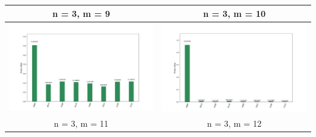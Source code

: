 \newpage
\begin{landscape}
\begin{table}[ht]
    \begin{tabular}{c c} 
        \hline
        n = 3, m = 9 & n = 3, m = 10 \\ \hline
        \includegraphics[scale=0.32]{Grover_results/Grover_n=3,m=9.png} & \includegraphics[scale=0.32]{Grover_results/Grover_n=3,m=10.png} \\ \hline
        n = 3, m = 11 & n = 3, m = 12 \\ \hline

\end{tabular}
\end{table}
\end{landscape}
